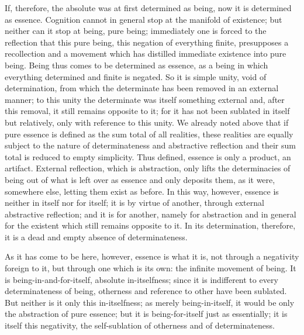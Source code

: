 If, therefore, the absolute was
at first determined as being,
now it is determined as essence.
Cognition cannot in general stop
at the manifold of existence;
but neither can it stop at being, pure being;
immediately one is forced to the reflection that
this pure being, this negation of everything finite,
presupposes a recollection and a movement
which has distilled immediate existence into pure being.
Being thus comes to be determined as essence,
as a being in which everything determined and finite is negated.
So it is simple unity, void of determination,
from which the determinate has been
removed in an external manner;
to this unity the determinate was
itself something external
and, after this removal,
it still remains opposite to it;
for it has not been sublated in itself but relatively,
only with reference to this unity.
We already noted above that if pure essence is defined
as the sum total of all realities,
these realities are equally subject to
the nature of determinateness and abstractive reflection
and their sum total is reduced to empty simplicity.
Thus defined, essence is only a product, an artifact.
External reflection, which is abstraction, only lifts
the determinacies of being out of what is left over as essence
and only deposits them, as it were, somewhere else,
letting them exist as before.
In this way, however, essence is neither in itself nor for itself;
it is by virtue of another, through external abstractive reflection;
and it is for another, namely for abstraction
and in general for the existent
which still remains opposite to it.
In its determination, therefore,
it is a dead and empty absence of determinateness.

As it has come to be here, however,
essence is what it is,
not through a negativity foreign to it,
but through one which is its own:
the infinite movement of being.
It is being-in-and-for-itself,
absolute in-itselfness;
since it is indifferent to
every determinateness of being,
otherness and reference to other have been sublated.
But neither is it only this in-itselfness;
as merely being-in-itself, it would be only
the abstraction of pure essence;
but it is being-for-itself just as essentially;
it is itself this negativity,
the self-sublation of otherness
and of determinateness.

